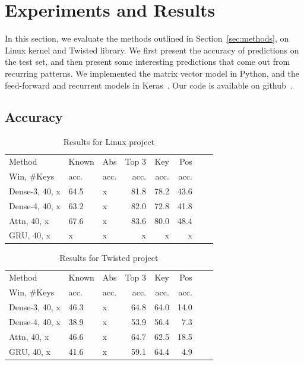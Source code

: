 \section{Experiments and Results}
\label{sec:results}

In this section, we evaluate the methods outlined in Section~\ref{sec:methods},
on Linux kernel and Twisted library. We first present the accuracy of
predictions on the test set, and then present some interesting predictions that
come out from recurring patterns. We implemented the matrix vector model in
Python, and the feed-forward and recurrent models in Keras~\cite{ref:keras}.
Our code is available on github~\cite{ref:codecompletion}.

\subsection{Accuracy}
\label{sec:accuracy}

\begin{table}[h]
  \centering
  \small {
  \begin{tabular}{l l l r r r r r}
    \hline
    Method & Known & Abs & Top 3 & Key & Pos \\
    Win, \#Keys & acc. & acc. & acc.  & acc. & acc. \\
    \hline
    Dense-3, 40, x & 64.5 & x & 81.8 & 78.2 & 43.6\\
    Dense-4, 40, x & 63.2 & x & 82.0 & 72.8 & 41.8\\
    Attn, 40, x & 67.6 & x & 83.6 & 80.0 & 48.4\\
    GRU, 40, x & x & x & x & x & x\\
    \hline
  \end{tabular}
  }
  \caption{Results for Linux project}
  \label{tab:linux}
\end{table}

\begin{table}[h]
  \centering
  \small {
  \begin{tabular}{l l l r r r r r}
    \hline
    Method & Known & Abs & Top 3 & Key & Pos \\
    Win, \#Keys & acc. & acc. & acc.  & acc. & acc. \\
    \hline
    Dense-3, 40, x & 46.3 & x & 64.8 & 64.0 & 14.0\\
    Dense-4, 40, x & 38.9 & x & 53.9 & 56.4 & 7.3\\
    Attn, 40, x & 46.6 & x & 64.7 & 62.5 & 18.5\\
    GRU, 40, x & 41.6 & x & 59.1 & 64.4 & 4.9\\
    \hline
  \end{tabular}
  }
  \caption{Results for Twisted project}
  \label{tab:twisted}
\end{table}

